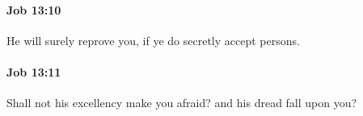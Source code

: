 		\paragraph{Job 13:10} %
			\label{JOB-13-10}

			He will surely reprove you, if ye do secretly accept persons.


		\paragraph{Job 13:11} %
			\label{JOB-13-11}

			Shall not his excellency make you afraid? and his dread fall upon you?


